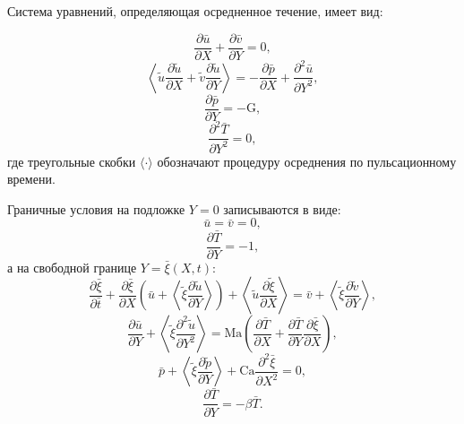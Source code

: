 \documentclass[12pt,a4paper]{article}
\begin{document}
Система уравнений, определяющая осредненное течение, имеет вид:

\begin{equation}\label{eq:avrg_div_thermal}
	\frac{\partial \bar{u}}{\partial X} + \frac{\partial \bar{v}}{\partial Y} = 0,
\end{equation}
\begin{equation}
	\left\langle \tilde{u} \frac{\partial \tilde{u}}{\partial X} + \tilde{v} \frac{\partial \tilde{u}}{\partial Y} \right\rangle = -\frac{\partial \bar{p}}{\partial X} + \frac{\partial^2 \bar{u}}{\partial Y^2},
\end{equation}
\begin{equation}
	\frac{\partial \bar{p}}{\partial Y} = -\mathrm{G},
\end{equation}
\begin{equation}
	\frac{\partial^2 \bar{T}}{\partial Y^2} = 0,
\end{equation}
где треугольные скобки \(\langle \cdot \rangle\) обозначают процедуру осреднения по пульсационному времени.

Граничные условия на подложке \( Y = 0 \) записываются в виде:
\begin{equation}
	\bar{u} = \bar{v} = 0,
\end{equation}
\begin{equation}
	\frac{\partial \bar{T}}{\partial Y} = -1,
\end{equation}
а на свободной границе \( Y = \bar{\xi}(X, t) \):
\begin{equation}
	\frac{\partial \bar{\xi}}{\partial \bar{t}}
	+ \frac{\partial \bar{\xi}}{\partial X} \left( \bar{u} + \left\langle \tilde{\xi} \frac{\partial \tilde{u}}{\partial Y}  \right\rangle \right)
	+ \left\langle \tilde{u} \frac{\partial \tilde{\xi}}{\partial X} \right\rangle
	= \bar{v} + \left\langle \tilde{\xi} \frac{\partial \tilde{v}}{\partial Y} \right\rangle,
\end{equation}
\begin{equation}
	\frac{\partial \bar{u}}{\partial Y}
	+ \left\langle \tilde{\xi} \frac{\partial^2 \tilde{u}}{\partial Y^2} \right\rangle
	= \mathrm{Ma} \left( \frac{\partial \bar{T}}{\partial X}
	+ \frac{\partial \bar{T}}{\partial Y} \frac{\partial \bar{\xi}}{\partial X} \right),
\end{equation}
\begin{equation}
	\bar{p} + \left\langle \tilde{\xi} \frac{\partial \tilde{p}}{\partial Y} \right\rangle
	+ \mathrm{Ca} \frac{\partial^2 \bar{\xi}}{\partial X^2} = 0,
\end{equation}
\begin{equation}\label{eq:avrg_temp_bc_thermal}
	\frac{\partial \bar{T}}{\partial Y} =- \beta \bar{T}.
\end{equation}
\end{document}

